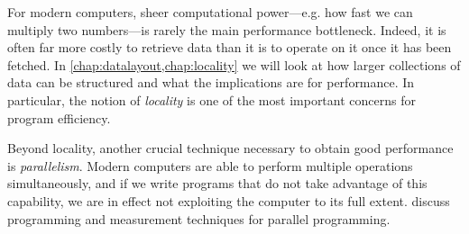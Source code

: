 For modern computers, sheer computational power---e.g. how fast we can
multiply two numbers---is rarely the main performance bottleneck.
Indeed, it is often far more costly to retrieve data than it is to
operate on it once it has been fetched.  In
\cref{chap:datalayout,chap:locality} we will look at how larger
collections of data can be structured and what the implications are
for performance.  In particular, the notion of \emph{locality} is one
of the most important concerns for program efficiency.

Beyond locality, another crucial technique necessary to obtain good
performance is \emph{parallelism}.  Modern computers are able to
perform multiple operations simultaneously, and if we write programs
that do not take advantage of this capability, we are in effect not
exploiting the computer to its full extent.
 discuss programming and measurement
techniques for parallel programming.

